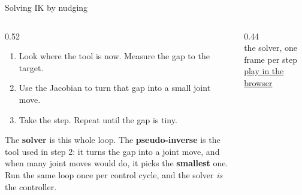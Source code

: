 \documentclass[aspectratio=169]{beamer}
\begin{document}
\begin{frame}{Solving IK by nudging}
	\begin{columns}[T]
		\begin{column}{0.52\textwidth}
			\begin{enumerate}\footnotesize
				\item Look where the tool is now. Measure the gap to the target.
				\item Use the Jacobian to turn that gap into a small joint move.
				\item Take the step. Repeat until the gap is tiny.
			\end{enumerate}
			\vspace{2mm}
			\footnotesize
			The \textbf{solver} is this whole loop. The \textbf{pseudo-inverse} is the tool used in step 2: it turns the gap into a joint move, and when many joint moves would do, it picks the \textbf{smallest} one.\\[2mm]
			Run the same loop once per control cycle, and the solver \emph{is} the controller.
		\end{column}
		\begin{column}{0.44\textwidth}
			\centering
			\\[0.5mm]
			{\tiny the solver, one frame per step \quad \href{https://raw.githubusercontent.com/ABC-iRobotics/advanced-robotics-project-course/main/week01_classical_robotics/slides/img/sim/ur5_ik_solver.gif}{\textcolor{blue!70!black}{play in the browser}}}
		\end{column}
	\end{columns}
\end{frame}
\end{document}
